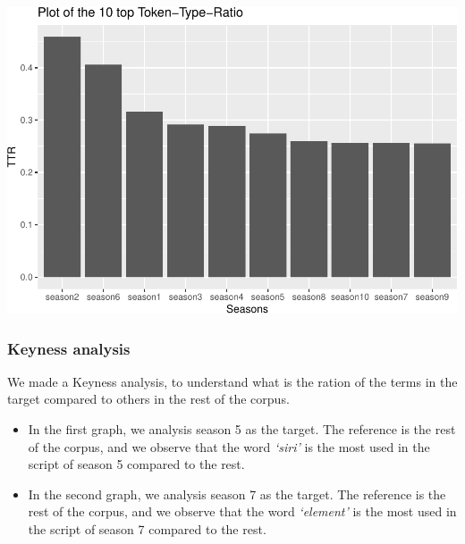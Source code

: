 \documentclass[
]{article}
\begin{document}
\includegraphics{report_files/figure-latex/unnamed-chunk-20-1.pdf}

\hypertarget{keyness-analysis}{%
\subsubsection{Keyness analysis}\label{keyness-analysis}}

We made a Keyness analysis, to understand what is the ration of the
terms in the target compared to others in the rest of the corpus.

\begin{itemize}
\item
  In the first graph, we analysis season 5 as the target. The reference
  is the rest of the corpus, and we observe that the word \emph{`siri'}
  is the most used in the script of season 5 compared to the rest.
\item
  In the second graph, we analysis season 7 as the target. The reference
  is the rest of the corpus, and we observe that the word
  \emph{`element'} is the most used in the script of season 7 compared
  to the rest.
\end{itemize}
\end{document}
